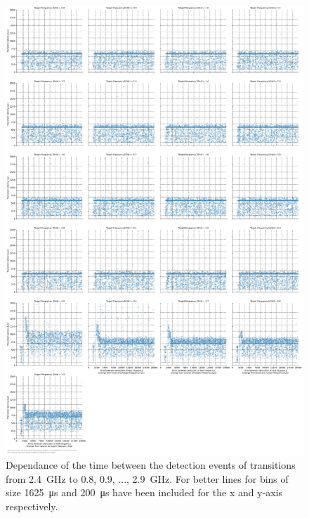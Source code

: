 \begin{figure}[]
    \centering
    \includegraphics[width=\columnwidth]{fig/ftalat/ftalat_scatter_wait_transition_latency_hati_source_2.4.pdf}
    \caption{Dependance of the time between the detection events of transitions from \SI{2.4}{\GHz} to \SI{0.8}{}, \SI{0.9}{}, ..., \SI{2.9}{\GHz}. For better lines for bins of size \SI{1625}{\us} and \SI{200}{\us} have been included for the x and y-axis respectively.}
\end{figure}
